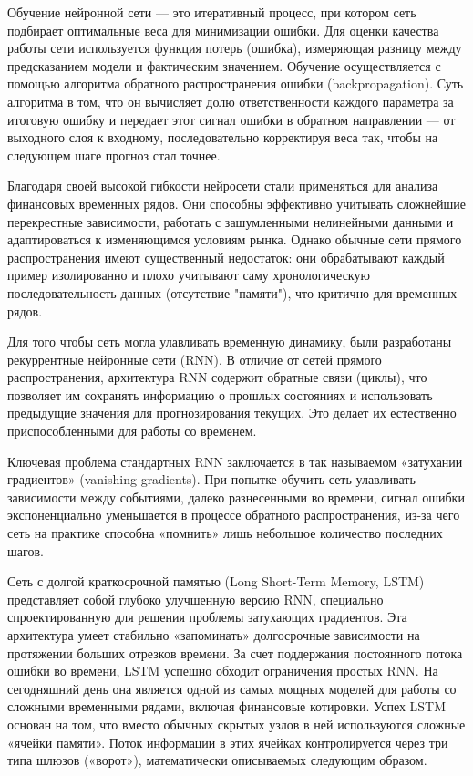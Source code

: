 \sloppy
Обучение нейронной сети — это итеративный процесс, при котором сеть подбирает оптимальные веса для минимизации ошибки. Для оценки качества работы сети используется функция потерь (ошибка), измеряющая разницу между предсказанием модели и фактическим значением. Обучение осуществляется с помощью алгоритма обратного распространения ошибки (backpropagation). Суть алгоритма в том, что он вычисляет долю ответственности каждого параметра за итоговую ошибку и передает этот сигнал ошибки в обратном направлении — от выходного слоя к входному, последовательно корректируя веса так, чтобы на следующем шаге прогноз стал точнее.

Благодаря своей высокой гибкости нейросети стали применяться для анализа финансовых временных рядов. Они способны эффективно учитывать сложнейшие перекрестные зависимости, работать с зашумленными нелинейными данными и адаптироваться к изменяющимся условиям рынка. Однако обычные сети прямого распространения имеют существенный недостаток: они обрабатывают каждый пример изолированно и плохо учитывают саму хронологическую последовательность данных (отсутствие "памяти"), что критично для временных рядов.

Для того чтобы сеть могла улавливать временную динамику, были разработаны рекуррентные нейронные сети (RNN). В отличие от сетей прямого распространения, архитектура RNN содержит обратные связи (циклы), что позволяет им сохранять информацию о прошлых состояниях и использовать предыдущие значения для прогнозирования текущих. Это делает их естественно приспособленными для работы со временем.

Ключевая проблема стандартных RNN заключается в так называемом «затухании градиентов» (vanishing gradients). При попытке обучить сеть улавливать зависимости между событиями, далеко разнесенными во времени, сигнал ошибки экспоненциально уменьшается в процессе обратного распространения, из-за чего сеть на практике способна «помнить» лишь небольшое количество последних шагов.

\sloppy
Сеть с долгой краткосрочной памятью (Long Short-Term Memory, LSTM)~\cite{hochreiter1997} представляет собой глубоко улучшенную версию RNN, специально спроектированную для решения проблемы затухающих градиентов. Эта архитектура умеет стабильно «запоминать» долгосрочные зависимости на протяжении больших отрезков времени. За счет поддержания постоянного потока ошибки во времени, LSTM успешно обходит ограничения простых RNN. На сегодняшний день она является одной из самых мощных моделей для работы со сложными временными рядами, включая финансовые котировки. Успех LSTM основан на том, что вместо обычных скрытых узлов в ней используются сложные «ячейки памяти». Поток информации в этих ячейках контролируется через три типа шлюзов («ворот»), математически описываемых следующим образом.

